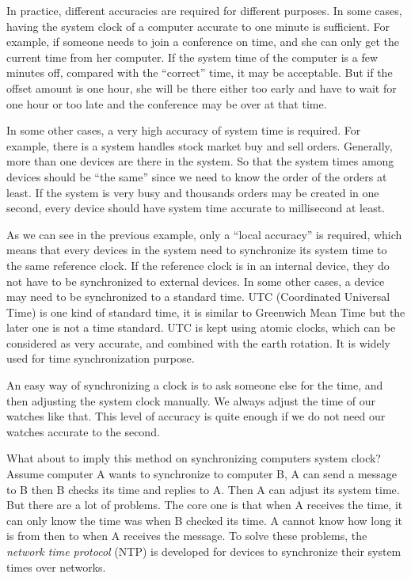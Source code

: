 In practice, different accuracies are required for different purposes. 
In some cases, having the system clock of a computer accurate to one
minute is sufficient. For example, if someone needs to join a conference on time,
and she can only get the current time from her computer. If the system time
of the computer is a few minutes off, compared with the ``correct'' time, it
may be acceptable. But if the offset amount is one hour, she will be there
either too early and have to wait for one hour or too late and the conference
may be over at that
time.

In some other cases, a very high accuracy of system time is required. For
example, there is a system handles stock market buy and sell orders. Generally,
more than one devices are there in the system. So that the system times among
devices should be ``the same'' since we need to know the order of the orders at
least. If the system is very busy and thousands orders may be created in one
second, every device should have system time accurate to millisecond at least.

As we can see in the previous example, only a ``local accuracy'' is required,
which means that every devices in the system need to synchronize its system
time to the same reference clock. If the reference clock is in an internal
device, they do not have to be synchronized to external devices. In some other
cases, a device may need to be synchronized to a standard time. 
UTC (Coordinated Universal Time) is one kind of standard time, it is similar 
to Greenwich Mean Time but the later one is not a time standard. UTC is kept
using atomic clocks, which can be considered as very accurate, and combined
with the earth rotation. It is widely used for time synchronization purpose.

An easy way of synchronizing a clock is to ask someone else for the time, and
then adjusting the system clock manually. We always adjust the time of our
watches like that. This level of  accuracy is quite enough if we do not need
our watches accurate to the second. 

What about to imply this method on synchronizing computers system clock? Assume
computer A wants to synchronize to computer B, A can send a message to B then B
checks its time and replies to A\null. Then A can adjust its system time.  
But there are a lot of problems.  The core one is that when A receives
the time, it can only know the time was when B checked its time. A cannot know
how long it is from then to when A receives the message. To solve these
problems, the \emph{network time protocol} (NTP) is developed for devices to
synchronize their system times over networks. 


